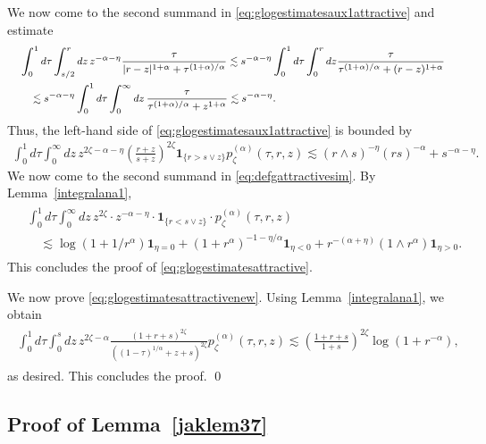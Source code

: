 \documentclass[12pt,reqno]{amsart}
\theoremstyle{definition}
\theoremstyle{remark}
\numberwithin{equation}{section}
\newcommand{\1}{\mathbbm{1}}
\newcommand{\one}{\mathbf{1}}
\begin{document}
We now come to the second summand in \eqref{eq:glogestimatesaux1attractive} and estimate
\begin{align}
  \footnotesize
  \begin{split}
    & \int_0^1 d\tau \int_{s/2}^r dz\, z^{-\alpha-\eta} \frac{\tau}{|r-z|^{1+\alpha}+\tau^{(1+\alpha)/\alpha}}
      \lesssim s^{-\alpha-\eta}\int_0^1 d\tau \int_{0}^r dz \frac{\tau}{\tau^{(1+\alpha)/\alpha}+(r-z)^{1+\alpha}} \\
    & \quad \lesssim s^{-\alpha-\eta} \int_0^1 d\tau \int_0^\infty dz\, \frac{\tau}{\tau^{(1+\alpha)/\alpha} + z^{1+\alpha}}
      \lesssim s^{-\alpha-\eta}.
  \end{split}
\end{align}
Thus, the left-hand side of \eqref{eq:glogestimatesaux1attractive} is bounded by
\begin{align}
  \int_0^1 d\tau \int_0^\infty dz\, z^{2\zeta-\alpha-\eta} \left(\frac{r+z}{s+z}\right)^{2\zeta} \one_{\{r>s\vee z\}} p_\zeta^{(\alpha)}(\tau,r,z)
  \lesssim (r\wedge s)^{-\eta} (rs)^{-\alpha} + s^{-\alpha-\eta}.
\end{align}
We now come to the second summand in \eqref{eq:defgattractivesim}. By Lemma~\ref{integralana1},
\begin{align}
  \begin{split}
    & \int_0^1 d\tau \int_0^\infty dz\, z^{2\zeta} \cdot z^{-\alpha-\eta} \cdot \one_{\{r<s\vee z\}}\cdot p_\zeta^{(\alpha)}(\tau,r,z) \\
    & \quad \lesssim \log(1+1/r^\alpha)\one_{\eta=0} + (1+r^\alpha)^{-1-\eta/\alpha} \one_{\eta<0} + r^{-(\alpha+\eta)}(1\wedge r^\alpha)\one_{\eta>0}.
  \end{split}
\end{align}
This concludes the proof of \eqref{eq:glogestimatesattractive}.

We now prove \eqref{eq:glogestimatesattractivenew}. Using Lemma~\ref{integralana1}, we obtain
\begin{align}
  \begin{split}
    \int_0^1 d\tau \int_0^{s} dz\, z^{2\zeta-\alpha}\frac{(1+r+s)^{2\zeta}}{((1-\tau)^{1/\alpha}+z+s)^{2\zeta}}p_\zeta^{(\alpha)}(\tau,r,z)
    \lesssim \left(\frac{1+r+s}{1+s}\right)^{2\zeta}\log(1+r^{-\alpha}),
  \end{split}
\end{align}
as desired. This concludes the proof. \qed

\subsection{Proof of Lemma~\ref{jaklem37}}
\end{document}
